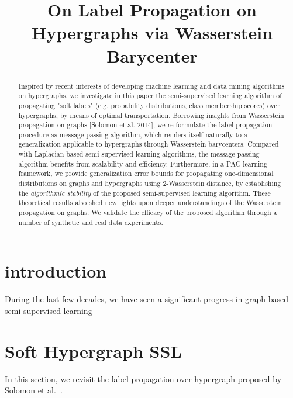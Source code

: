 

\title{\LARGE \bf
	On Label Propagation on Hypergraphs via Wasserstein Barycenter
}



\maketitle
	
\begin{abstract}
Inspired by recent interests of developing machine learning and data mining algorithms on hypergraphs, we investigate in this paper the semi-supervised learning algorithm of propagating "soft labels" (e.g. probability distributions, class membership scores) over hypergraphs, by means of optimal transportation. Borrowing insights from Wasserstein propagation on graphs [Solomon et al. 2014], we re-formulate the label propagation procedure as message-passing algorithm, which renders itself naturally to a generalization applicable to hypergraphs through Wasserstein barycenters. Compared with Laplacian-based semi-supervised learning algorithms, the message-passing algorithm benefits from scalability and efficiency. Furthermore, in a PAC learning framework, we provide generalization error bounds for propagating one-dimensional distributions on graphs and hypergraphs using 2-Wasserstein distance, by establishing the \textit{algorithmic stability} of the proposed semi-supervised learning algorithm. These theoretical results also shed new lights upon deeper understandings of the Wasserstein propagation on graphs. We validate the efficacy of the proposed algorithm through a number of synthetic and real data experiments.
\end{abstract}
\section{introduction}
During the last few decades, we have seen a significant progress in graph-based semi-supervised learning



















\section{Soft Hypergraph SSL}
\label{Sec:Solomon}
In this section, we revisit the label propagation over hypergraph proposed by Solomon et al.\ \cite{Solomon:2014}.


